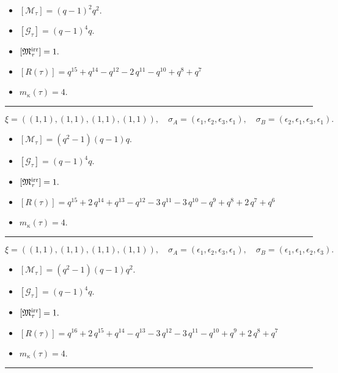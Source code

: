 \documentclass[10pt,a4paper]{amsart}
\begin{document}
\begin{itemize}
 \item $[\mathcal{M}_{\tau}] = {\left(q - 1\right)}^{2} q^{2} .$

 \item $[\mathcal{G}_{\tau}] = {\left(q - 1\right)}^{4} q .$

 \item $[{\frak M}_{\tau}^{\textrm{irr}}] = 1 .$

 \item $[R(\tau)] = q^{15} + q^{14} - q^{12} - 2 \, q^{11} - q^{10} + q^{8} + q^{7} $

 \item $m_{\kappa}(\tau) = 4 .$

 \end{itemize}
\noindent\rule{8cm}{0.4pt}

$$\xi = ({(1, 1), (1, 1)}, {(1, 1)}, {(1, 1)}),\quad \sigma_A = ({{\epsilon_1}, {\epsilon_2}}, {{\epsilon_3}}, {{\epsilon_1}}),\quad \sigma_B = ({{\epsilon_2}, {\epsilon_1}}, {{\epsilon_3}}, {{\epsilon_1}}).$$

\begin{itemize}
 \item $[\mathcal{M}_{\tau}] = {\left(q^{2} - 1\right)} {\left(q - 1\right)} q .$

 \item $[\mathcal{G}_{\tau}] = {\left(q - 1\right)}^{4} q .$

 \item $[{\frak M}_{\tau}^{\textrm{irr}}] = 1 .$

 \item $[R(\tau)] = q^{15} + 2 \, q^{14} + q^{13} - q^{12} - 3 \, q^{11} - 3 \, q^{10} - q^{9} + q^{8} + 2 \, q^{7} + q^{6} $

 \item $m_{\kappa}(\tau) = 4 .$

 \end{itemize}
\noindent\rule{8cm}{0.4pt}

$$\xi = ({(1, 1), (1, 1)}, {(1, 1)}, {(1, 1)}),\quad \sigma_A = ({{\epsilon_1}, {\epsilon_2}}, {{\epsilon_3}}, {{\epsilon_1}}),\quad \sigma_B = ({{\epsilon_1}, {\epsilon_1}}, {{\epsilon_2}}, {{\epsilon_3}}).$$

\begin{itemize}
 \item $[\mathcal{M}_{\tau}] = {\left(q^{2} - 1\right)} {\left(q - 1\right)} q^{2} .$

 \item $[\mathcal{G}_{\tau}] = {\left(q - 1\right)}^{4} q .$

 \item $[{\frak M}_{\tau}^{\textrm{irr}}] = 1 .$

 \item $[R(\tau)] = q^{16} + 2 \, q^{15} + q^{14} - q^{13} - 3 \, q^{12} - 3 \, q^{11} - q^{10} + q^{9} + 2 \, q^{8} + q^{7} $

 \item $m_{\kappa}(\tau) = 4 .$

 \end{itemize}
\noindent\rule{8cm}{0.4pt}
\end{document}
